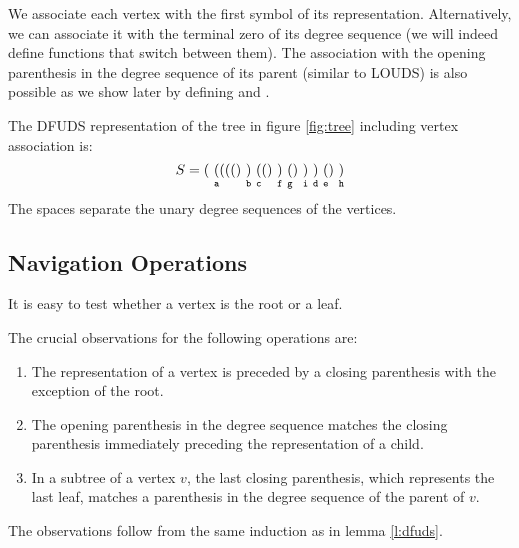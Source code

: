 We associate each vertex with the first symbol of its representation.
Alternatively, we can associate it with the terminal zero of its degree sequence (we will indeed define functions that switch between them).
The association with the opening parenthesis in the degree sequence of its parent (similar to LOUDS) is also possible as we show later by defining \dfudsRank{} and \dfudsSelect{}.

\begin{example}
	The DFUDS representation of the tree in figure \ref{fig:tree} including vertex association is:
	$$ S = \mathtt{( ~ \x(a((() ~ \x)b ~ \x(c() ~ \x)f ~ \x(g) ~ \x)i ~ \x)d ~ \x(e) ~ \x)h }$$ 
	The spaces separate the unary degree sequences of the vertices.
\end{example}

\subsection{Navigation Operations}

It is easy to test whether a vertex is the root or a leaf.

\begin{algorithm}
\begin{algorithmic}
	\State {} 
\EndFunction
\end{algorithmic}
\end{algorithm}

\begin{algorithm}
\begin{algorithmic}
	\State {} 
\EndFunction
\end{algorithmic}
\end{algorithm}

The crucial observations for the following operations are:
\begin{enumerate}
	\item The representation of a vertex is preceded by a closing parenthesis with the exception of the root.
	\item The opening parenthesis in the degree sequence matches the closing parenthesis immediately preceding the representation of a child.
	\item In a subtree of a vertex $v$, the last closing parenthesis, which represents the last leaf, matches a parenthesis in the degree sequence of the parent of $v$.
\end{enumerate}
The observations follow from the same induction as in lemma \ref{l:dfuds}.

